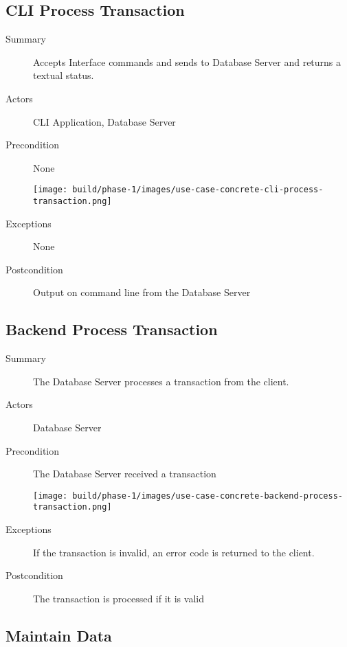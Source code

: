 \documentclass[a4paper]{report}
\begin{document}
	\pagebreak

	\subsection{CLI Process Transaction}

	\begin{description}
		\item[Summary] Accepts Interface commands and sends to Database Server and returns a textual status.
		\item[Actors] CLI Application, Database Server
		\item[Precondition] None

		\begin{center}
			\texttt{[image: build/phase-1/images/use-case-concrete-cli-process-transaction.png]}
		\end{center}

		\item[Exceptions] None
		\item[Postcondition] Output on command line from the Database Server
	\end{description}

	\pagebreak

	\subsection{Backend Process Transaction}

	\begin{description}
		\item[Summary] The Database Server processes a transaction from the client.
		\item[Actors] Database Server
		\item[Precondition] The Database Server received a transaction

		\begin{center}
			\texttt{[image: build/phase-1/images/use-case-concrete-backend-process-transaction.png]}
		\end{center}

		\item[Exceptions] If the transaction is invalid, an error code is returned to the client.
		\item[Postcondition] The transaction is processed if it is valid
	\end{description}
	
	\pagebreak

	\subsection{Maintain Data}
\end{document}
